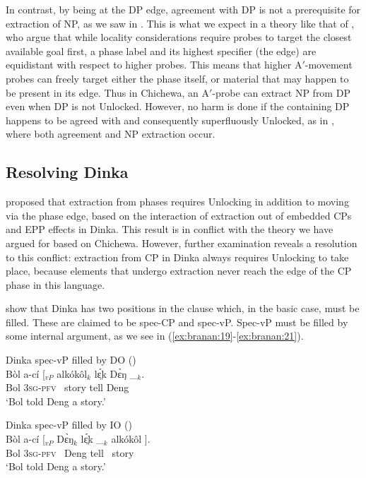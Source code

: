 \documentclass[output=paper,colorlinks,citecolor=brown]{langscibook}
\begin{document}
In contrast, by being at the DP edge, agreement with DP is not a prerequisite for extraction of NP, as we saw in . This is what we expect in a theory like that of \citet{RackowskiRichards2005}, who argue that while locality considerations require probes to target the closest available goal first, a phase label and its highest specifier (the edge) are equidistant with respect to higher probes. This means that higher A$'$-movement probes can freely target either the phase itself, or material that may happen to be present in its edge. Thus in Chichewa, an A$'$-probe can extract NP from DP even when DP is not Unlocked. However, no harm is done if the containing DP happens to be agreed with and consequently superfluously Unlocked, as in , where both agreement and NP extraction occur.

\subsection{Resolving Dinka}\label{sec:branan:5.2}

\citet{VanUrkRichards2015} proposed that extraction from phases requires Unlocking in addition to moving via the phase edge, based on the interaction of extraction out of embedded CPs and EPP effects in Dinka. This result is in conflict with the theory we have argued for based on Chichewa. However, further examination reveals a resolution to this conflict: extraction from CP in Dinka always requires Unlocking to take place, because elements that undergo extraction never reach the edge of the CP phase in this language.

\citeauthor{VanUrkRichards2015} show that Dinka has two positions in the clause which, in the basic case, must be filled. These are claimed to be spec-CP and spec-vP. Spec-vP must be filled by some internal argument, as we see in (\ref{ex:branan:19}-\ref{ex:branan:21}).

\ea%
    \label{ex:branan:19}
    Dinka spec-vP filled by DO \hfill{(\citealt[ex. 33b]{VanUrkRichards2015})}\\
    \gll    B\`{o}l a-c\'{i} [$_{vP}$ alk\'{o}k\^{o}l$_{k}$  lɛ̤́k  D\`{ɛ}ŋ \_$_{k}$. \\
            Bol \textsc{3sg-pfv} \,  story tell Deng \\
    \glt    `Bol told Deng a story.'
\z

\ea%
    \label{ex:branan:20}
    Dinka spec-vP filled by IO \hfill{(\citealt[ex. 33a]{VanUrkRichards2015})}\\
    \gll    B\`{o}l a-c\'{i} [$_{vP}$ D\`{ɛ}ŋ$_{k}$ lɛ̤́k \_$_{k}$ alk\'{o}k\^{o}l ]. \\
            Bol \textsc{3sg-pfv} \,  Deng tell \,  story \\
    \glt    `Bol told Deng a story.'
\z
\end{document}
